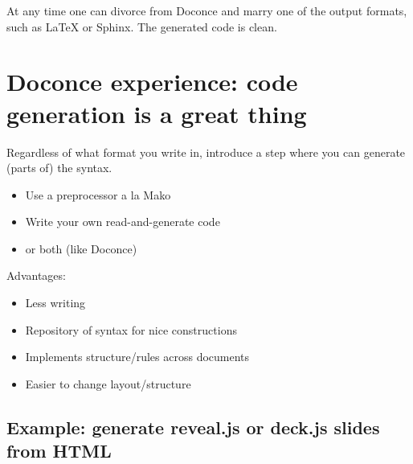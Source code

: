 \documentclass[%
twoside,                 %
final,                   %
chapterprefix=true,      %
open=right               %
10pt]{book}
\newenvironment{graybox1admon}[1][]{
\begin{graybox1mdframed}[frametitle=#1]
}
{
\end{graybox1mdframed}
}
\begin{document}
\noindent

\begin{graybox1admon}[Doconce divorce.]
At any time one can divorce from Doconce and marry one of the output
formats, such as {\LaTeX} or Sphinx. The generated code is clean.
\end{graybox1admon}



\section*{Doconce experience: code generation is a great thing}


\begin{graybox1admon}[]

Regardless of what format you write in, introduce a step where
you can generate (parts of) the syntax.

\begin{itemize}
 \item Use a preprocessor a la Mako

 \item Write your own read-and-generate code

 \item or both (like Doconce)
\end{itemize}

\noindent
Advantages:

\begin{itemize}
 \item Less writing

 \item Repository of syntax for nice constructions

 \item Implements structure/rules across documents

 \item Easier to change layout/structure
\end{itemize}

\noindent
\end{graybox1admon}



\subsection*{Example: generate reveal.js or deck.js slides from HTML}
\end{document}
